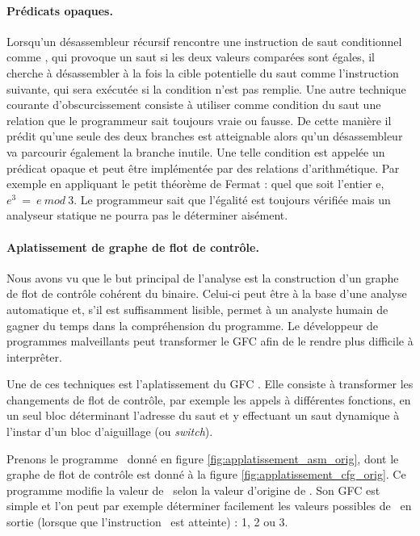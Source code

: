 \paragraph{Prédicats opaques.}
Lorsqu'un désassembleur récursif rencontre une instruction de saut conditionnel comme \je, qui provoque un saut si les deux valeurs comparées sont égales, il cherche à désassembler à la fois la cible potentielle du saut comme l'instruction suivante, qui sera exécutée si la condition n'est pas remplie.
Une autre technique courante d'obscurcissement \cite{MKK07} consiste à utiliser comme condition du saut une relation que le programmeur sait toujours vraie ou fausse. De cette manière il prédit qu'une seule des deux branches est atteignable alors qu'un désassembleur va parcourir également la branche inutile.
Une telle condition est appelée un prédicat opaque et peut être implémentée par des relations d'arithmétique. Par exemple en appliquant le petit théorème de Fermat : quel que soit l'entier e, $e^3\ =\ e\ mod\ 3$.
Le programmeur sait que l'égalité est toujours vérifiée mais un analyseur statique ne pourra pas le déterminer aisément.

\paragraph{Aplatissement de graphe de flot de contrôle.}
Nous avons vu que le but principal de l'analyse est la construction d'un graphe de flot de contrôle cohérent du binaire.
Celui-ci peut être à la base d'une analyse automatique et, s'il est suffisamment lisible, permet à un analyste humain de gagner du temps dans la compréhension du programme.
Le développeur de programmes malveillants peut transformer le GFC afin de le rendre plus difficile à interprêter.

Une de ces techniques est l'aplatissement du GFC \cite{Wang2000}. Elle consiste à transformer les changements de flot de contrôle, par exemple les appels à différentes fonctions, en un seul bloc déterminant l'adresse du saut et y effectuant un saut dynamique à l'instar d'un bloc d'aiguillage (ou \emph{switch}).

Prenons le programme \xq\ donné en figure \ref{fig:applatissement_asm_orig}, dont le graphe de flot de contrôle est donné à la figure \ref{fig:applatissement_cfg_orig}.
Ce programme modifie la valeur de \edi\ selon la valeur d'origine de \ebx. Son GFC est simple et l'on peut par exemple déterminer facilement les valeurs possibles de \edi\ en sortie (lorsque que l'instruction \ret\ est atteinte) : 1, 2 ou 3.

